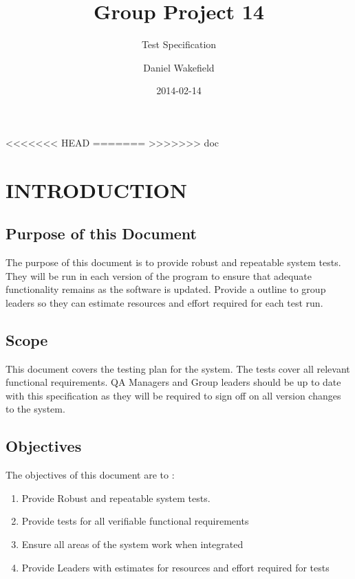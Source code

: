 \documentclass{project}
\begin{document}
\title{Group Project 14}

\subtitle{Test Specification}
\author{Daniel Wakefield}
<<<<<<< HEAD
=======
>>>>>>> doc
\date{2014-02-14}

\maketitle
\tableofcontents
\newpage


\section{INTRODUCTION}

\subsection{Purpose of this Document}
The purpose of this document is to provide robust and repeatable system tests.
They will be run in each version of the program to ensure that adequate 
functionality remains as the software is updated. Provide a outline to 
group leaders so they can estimate resources and effort required for each test
run.


\subsection{Scope}
This document covers the testing plan for the system. The tests cover all relevant functional requirements. QA Managers and Group leaders should be
up to date with this specification as they will be required to sign off
on all version changes to the system.


\subsection{Objectives}
The objectives of this document are to :
\begin{enumerate}
\item Provide Robust and repeatable system tests.
\item Provide tests for all verifiable functional requirements
\item Ensure all areas of the system work when integrated
\item Provide Leaders with estimates for resources and effort required
for tests

\end {enumerate}
\end{document}
